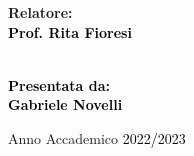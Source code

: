 \documentclass[12pt,a4paper]{report}
\theoremstyle{definition}
\theoremstyle{Theorem}
\theoremstyle{definition}
\theoremstyle{definition}
\theoremstyle{definition}
\begin{document}
\begin{frontespizio}
\begin{titlepage}
			\begin{minipage}[t]{0.47\textwidth}
				{\large{\bf Relatore: \vspace{2mm}\\\textcolor{black}{
							Prof. Rita Fioresi}\\\\
					}}
			\end{minipage}
			\hfill
			\begin{minipage}[t]{0.47\textwidth}\raggedleft \textcolor{black}{
					{\large{\bf Presentata da:
							\vspace{2mm}\\
							Gabriele Novelli}}}
			\end{minipage}
			
			\vspace{40mm}
			
			\begin{center}
				Anno Accademico \textcolor{black}{ 2022/2023}
			\end{center}
			
		\end{titlepage}
		\end{frontespizio}
	\tableofcontents
\end{document}
